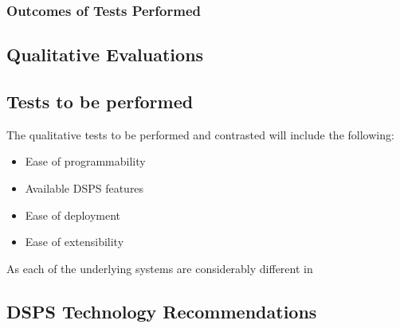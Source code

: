 

\subsubsection{Outcomes of Tests Performed} %
\label{sub:outcomes_of_tests_performed}






\subsection{Qualitative Evaluations} %
\label{sub:qualitative_evaluations}


\subsection{Tests to be performed} %
\label{sub:tests_to_be_performed}

The qualitative tests to be performed and contrasted will include the following:

\begin{itemize}
  \item Ease of programmability
  \item Available DSPS features
  \item Ease of deployment
  \item Ease of extensibility
\end{itemize}

As each of the underlying systems are considerably different in




\subsection{DSPS Technology Recommendations} %
\label{sub:dsps_technology_recommendations}

